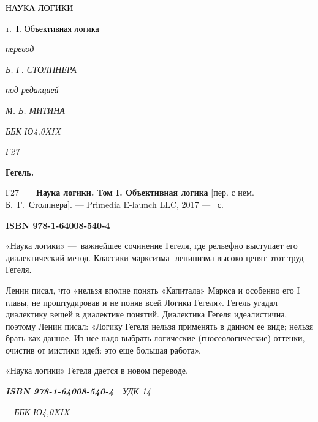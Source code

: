 \documentclass[twoside]{article}
\title{}
\newcommand\textstylexixiiipt[1]{\textmd{\textup{\textcolor{black}{#1}}}}
\begin{document}
\clearpage{}

{\centering
\textstylexixiiipt{НАУКА ЛОГИКИ}
\par}

{\centering
\textstylexixiiipt{т.~I. Объективная логика}
\par}


\bigskip

{\centering
\textit{перевод}
\par}

{\centering
\textit{Б. Г. СТОЛПНЕРА}
\par}


\bigskip

{\centering
\textit{под редакцией}
\par}

{\centering
\textit{М. Б. МИТИНА}
\par}


\bigskip

\clearpage{}

{\itshape
\textup{ББК Ю4,0{\textquotedbl}XIX{\textquotedbl}}}

{\itshape
\textup{Г27}}

\textbf{Гегель.}

Г27\ \ \ \ \textbf{Наука логики. Том I. Объективная логика} [пер. с нем.
Б.~Г.~Столпнера]. — Primedia E-launch LLC, 2017 —
\pageref{bkm:bmEndContent}~с.

\textbf{ISBN 978-1-64008-540-4}

«Наука логики» —~важнейшее сочинение Гегеля, где рельефно выступает его
диалектический метод. Классики марксизма- ленинизма высоко ценят этот труд
Гегеля.

Ленин писал, что «нельзя вполне понять «Капитала» Маркса и особенно его I
главы, не проштудировав и не поняв всей Логики Гегеля». Гегель угадал
диалектику вещей в диалектике понятий. Диалектика Гегеля идеалистична,
поэтому Ленин писал: «Логику Гегеля нельзя применять в данном ее виде;
нельзя брать как данное. Из нее надо выбрать логические (гносеологические)
оттенки, очистив от мистики идей: это еще большая работа».

«Наука логики» Гегеля дается в новом переводе.

{\itshape
\textbf{\textup{ISBN 978-1-64008-540-4}}\textup{\ \ УДК 14}}

{\itshape
\textup{\ \ ББК Ю4,0{\textquotedbl}XIX{\textquotedbl}}}
\end{document}
